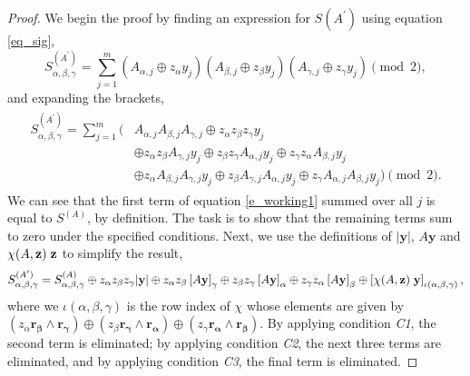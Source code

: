 \documentclass[notitlepage]{article}
\theoremstyle{definition}
\theoremstyle{problem}
\theoremstyle{lemma}
\begin{document}
		\begin{proof}
			We begin the proof by finding an expression for $S(A^\prime)$ using equation \ref{eq_sig},
			\begin{equation}
			S^{(A^\prime)}_{\alpha,\beta,\gamma} = \sum_{j=1}^{m}\left(A_{\alpha,j}\oplus z_\alpha y_j\right)\left(A_{\beta,j}\oplus z_\beta y_j\right)\left(A_{\gamma,j}\oplus z_\gamma y_j\right) \pmod{2},
			\end{equation}
			and expanding the brackets,
			\begin{align}
			\label{e_working1}
			\begin{split}
			S^{(A^\prime)}_{\alpha,\beta,\gamma} = \sum_{j=1}^{m}(&A_{\alpha,j}A_{\beta,j}A_{\gamma,j} \oplus z_\alpha z_\beta z_\gamma y_j  \\			
			&\oplus z_\alpha z_\beta A_{\gamma,j} y_j \oplus z_\beta z_\gamma A_{\alpha,j} y_j \oplus z_\gamma z_\alpha A_{\beta,j} y_j \\
			&\oplus z_\alpha A_{\beta,j} A_{\gamma,j} y_j \oplus z_\beta A_{\gamma,j} A_{\alpha,j} y_j \oplus z_\gamma A_{\alpha,j} A_{\beta,j} y_j) \pmod{2}.
			\end{split}
			\end{align}
			We can see that the first term of equation \ref{e_working1} summed over all $j$ is equal to $S^{(A)}$, by definition. The task is to show that the remaining terms sum to zero under the specified conditions. Next, we use the definitions of $|\mathbf{y}|$, $A\mathbf{y}$ and $\chi(A,\mathbf{z})\hspace{1mm}\mathbf{z}$ to simplify the result,
			\begin{equation}
			S^{(A^\prime)}_{\alpha,\beta,\gamma} = S^{(A)}_{\alpha,\beta,\gamma} \oplus z_\alpha z_\beta z_\gamma |\mathbf{y}| \oplus z_\alpha z_\beta \left[A\mathbf{y}\right]_\gamma \oplus z_\beta z_\gamma \left[A\mathbf{y}\right]_\alpha \oplus z_\gamma z_\alpha \left[A\mathbf{y}\right]_\beta \oplus \left[\chi(A,\mathbf{z})\hspace{1mm}\mathbf{y}\right]_{\iota(\alpha,\beta,\gamma)},
			\end{equation}
			where we $\iota(\alpha,\beta,\gamma)$ is the row index of $\chi$ whose elements are given by $(z_\alpha\mathbf{r_\beta}\wedge\mathbf{r_\gamma})\oplus (z_\beta\mathbf{r_\gamma}\wedge\mathbf{r_\alpha})\oplus (z_\gamma\mathbf{r_\alpha}\wedge\mathbf{r_\beta})$.		
			By applying condition \emph{C1}, the second term is eliminated; by applying condition \emph{C2}, the next three terms are eliminated, and by applying condition \emph{C3}, the final term is eliminated.
		\end{proof}
	
\end{document}

